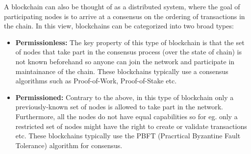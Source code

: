 A blockchain can also be thought of as a distributed system, where the goal of participating nodes is to arrive at a consensus on the ordering of transactions in the chain. In this view, blockchains can be categorized into two broad types: 

\begin{itemize}
    \item \textbf{Permissionless: } The key property of this type of blockchain is that the set of nodes that take part in the consensus process (over the state of chain) is not known beforehand so anyone can join the network and participate in maintainance of the chain. These blockchains typically use a consensus algorithms such as Proof-of-Work, Proof-of-Stake etc.
    
    \item \textbf{Permissioned: } Contrary to the above, in this type of blockchain only a previously-known set of nodes is allowed to take part in the network. Furthermore, all the nodes do not have equal capabilities so for eg. only a restricted set of nodes might have the right to create or validate transactions etc. These blockchains typically use the PBFT (Pracrtical Byzantine Fault Tolerance) algorithm for consensus.
\end{itemize}

